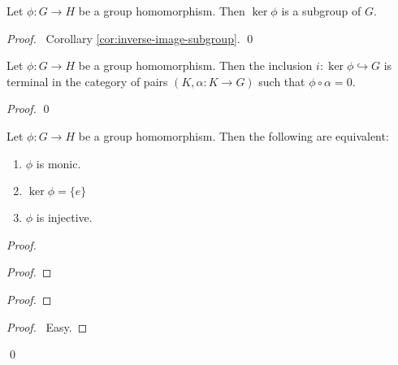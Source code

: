 \begin{prop}
Let $\phi : G \rightarrow H$ be a group homomorphism. Then $\ker \phi$ is a subgroup of $G$.
\end{prop}

\begin{proof}
\pf\ Corollary \ref{cor:inverse-image-subgroup}. \qed
\end{proof}

\begin{prop}
Let $\phi : G \rightarrow H$ be a group homomorphism. Then the inclusion $i : \ker \phi \hookrightarrow G$ is terminal in the category of pairs $(K,\alpha : K \rightarrow G)$ such that $\phi \circ \alpha = 0$.
\end{prop}

\begin{proof}
\pf
{}
\qed
\end{proof}

\begin{prop}
\label{prop:ker-zero}
Let $\phi : G \rightarrow H$ be a group homomorphism. Then the following are equivalent:
\begin{enumerate}
\item $\phi$ is monic.
\item $\ker \phi = \{e\}$
\item $\phi$ is injective.
\end{enumerate}
\end{prop}

\begin{proof}
\pf
{}
\begin{proof}
\end{proof}
\begin{proof}
\end{proof}
\begin{proof}
	\pf\ Easy.
\end{proof}
\qed
\end{proof}

